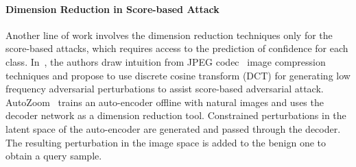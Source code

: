 \paragraph{Dimension Reduction in Score-based Attack}
Another line of work involves the dimension reduction techniques only for the score-based attacks, which requires access to the prediction of confidence for each class.
In~\cite{guo2018low}, the authors draw intuition from JPEG codec~\cite{wallace1992jpeg} image compression techniques and propose to use discrete cosine transform (DCT) for generating low frequency adversarial perturbations to assist score-based adversarial attack.
AutoZoom~\cite{tu2019autozoom} trains an auto-encoder offline with natural images and uses the decoder network as a dimension reduction tool. Constrained perturbations in the latent space of the auto-encoder are generated and passed through the decoder. The resulting perturbation in the image space is added to the benign one to obtain a query sample. 